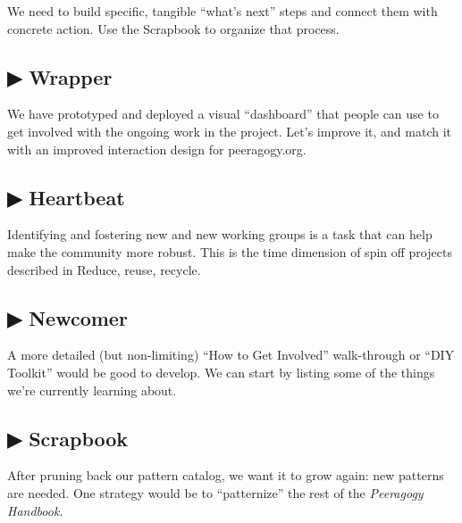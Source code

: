 We need to build specific, tangible ``what's next'' steps and connect
them with concrete action. Use the Scrapbook to organize that process.

\hypertarget{wrapper}{%
\subsection{▶ Wrapper}\label{wrapper}}

We have prototyped and deployed a visual ``dashboard'' that people can
use to get involved with the ongoing work in the project. Let's improve
it, and match it with an improved interaction design for peeragogy.org.

\hypertarget{heartbeat}{%
\subsection{▶ Heartbeat}\label{heartbeat}}

Identifying and fostering new and new working groups is a task that can
help make the community more robust. This is the time dimension of spin
off projects described in Reduce, reuse, recycle.

\hypertarget{newcomer}{%
\subsection{▶ Newcomer}\label{newcomer}}

A more detailed (but non-limiting) ``How to Get Involved'' walk-through
or ``DIY Toolkit'' would be good to develop. We can start by listing
some of the things we're currently learning about.

\hypertarget{scrapbook}{%
\subsection{▶ Scrapbook}\label{scrapbook}}

After pruning back our pattern catalog, we want it to grow again: new
patterns are needed. One strategy would be to ``patternize'' the rest of
the \emph{Peeragogy Handbook.}
